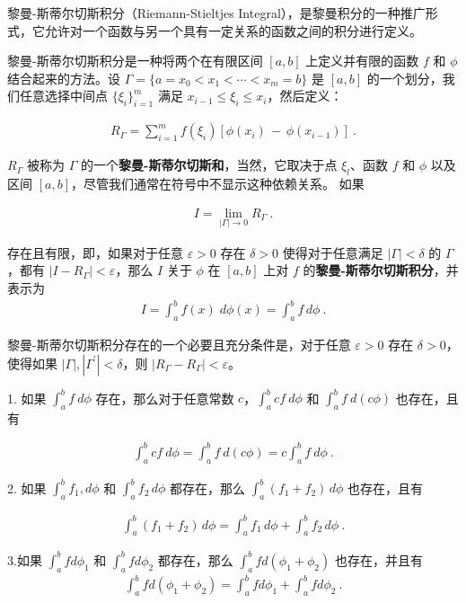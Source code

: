
黎曼-斯蒂尔切斯积分（Riemann-Stieltjes Integral），是黎曼积分的一种推广形式，它允许对一个函数与另一个具有一定关系的函数之间的积分进行定义。

黎曼-斯蒂尔切斯积分是一种将两个在有限区间 $ [a, b] $ 上定义并有限的函数 $ f $ 和 $ \phi $ 结合起来的方法。设 $ \Gamma=\{a=x_{0}<x_{1}<\cdots<x_{m}=b\} $ 是 $ [a, b] $ 的一个划分，我们任意选择中间点 $ \{\xi_{i}\}_{i=1}^{m} $ 满足 $ x_{i-1}\leq\xi_{i}\leq x_{i} $，然后定义：

\begin{align}
R_{\Gamma}=\sum_{i=1}^{m}f(\xi_{i})[\phi(x_{i})\,-\,\phi(x_{i-1})]~.
\end{align}

$ R_{\Gamma} $ 被称为 $ \Gamma $ 的一个\textbf{黎曼-斯蒂尔切斯和}，当然，它取决于点 $ \xi_{l} $、函数 $ f $ 和 $ \phi $ 以及区间 $ [a, b] $，尽管我们通常在符号中不显示这种依赖关系。
如果

\begin{align}
I=\lim_{|\Gamma|\to0}R_{\Gamma}~.
\end{align}

存在且有限，即，如果对于任意 $ \varepsilon>0 $ 存在 $ \delta>0 $ 使得对于任意满足 $ |\Gamma|<\delta $ 的 $ \Gamma $，都有 $ |I-R_{\Gamma}|<\varepsilon $，那么 $ I $ 关于 $ \phi $ 在 $ [a, b] $ 上对 $ f $ 的\textbf{黎曼-斯蒂尔切斯积分}，并表示为
\begin{align}
I=\int_{a}^{b}\!f(x)\;d\phi(x)=\int_{a}^{b}\!f\,d\phi~.
\end{align}

黎曼-斯蒂尔切斯积分存在的一个必要且充分条件是，对于任意 $ \varepsilon>0 $ 存在 $ \delta>0 $，使得如果 $ |\Gamma|,|\Gamma^{\prime}|<\delta $，则 $ |R_{\Gamma}-R_{\Gamma}|<\varepsilon $。

\begin{theorem}{}
1. 如果 $\int_{a}^{b}f\ d\phi$ 存在，那么对于任意常数 $c$，$\int_{a}^{b}cf\ d\phi$ 和 $\int_{a}^{b}f\ d(c\phi)$ 也存在，且有

\begin{align} \int_{a}^{b}cf\ d\phi=\int_{a}^{b}f\ d(c\phi)=c\int_{a}^{b}f\ d\phi~. \end{align}

2.
如果 $\int_{a}^{b}f_{1},d\phi$ 和 $\int_{a}^{b}f_{2}\,d\phi$ 都存在，那么 $\int_{a}^{b}(f_{1}+f_{2})\,d\phi$ 也存在，且有

\begin{align} \int_{a}^{b}(f_{1}+f_{2})\,d\phi=\int_{a}^{b}f_{1}\,d\phi+\int_{a}^{b}f_{2}\,d\phi~. \end{align}

3.如果 $ \int_{a}^{b}fd\phi_{1} $ 和 $ \int_{a}^{b}fd\phi_{2} $ 都存在，那么 $ \int_{a}^{b}fd(\phi_{1}+\phi_{2}) $ 也存在，并且有 \begin{align} \int_{a}^{b}fd(\phi_{1}+\phi_{2})=\int_{a}^{b}fd\phi_{1}+\int_{a}^{b}fd\phi_{2}~. \end{align}
\end{theorem}

